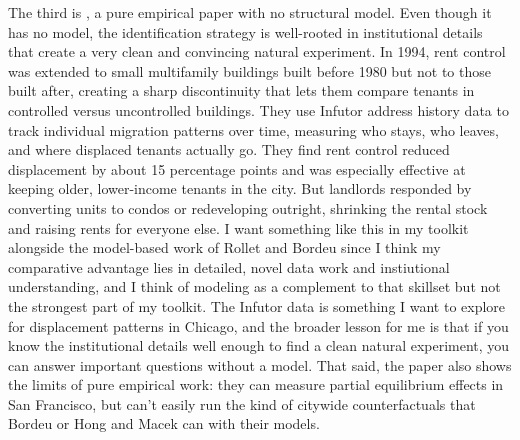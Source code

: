 \documentclass{article}
\begin{document}
The third is \cite{diamond_effects_2019}, a pure empirical paper with no structural model.
Even though it has no model, the identification strategy is well-rooted in institutional details that create a very clean and convincing natural experiment. 
In 1994, rent control was extended to small multifamily buildings built before 1980 but not to those built after, creating a sharp discontinuity that lets them compare tenants in controlled versus uncontrolled buildings.
They use Infutor address history data to track individual migration patterns over time, measuring who stays, who leaves, and where displaced tenants actually go.
They find rent control reduced displacement by about 15 percentage points and was especially effective at keeping older, lower-income tenants in the city.
But landlords responded by converting units to condos or redeveloping outright, shrinking the rental stock and raising rents for everyone else.
I want something like this in my toolkit alongside the model-based work of Rollet and Bordeu since I think my comparative advantage lies in detailed, novel data work and instiutional understanding, and I think of modeling as a complement to that skillset but not the strongest part of my toolkit. 
The Infutor data is something I want to explore for displacement patterns in Chicago, and the broader lesson for me is that if you know the institutional details well enough to find a clean natural experiment, you can answer important questions without a model.
That said, the paper also shows the limits of pure empirical work: they can measure partial equilibrium effects in San Francisco, but can't easily run the kind of citywide counterfactuals that Bordeu or Hong and Macek can with their models.
\clearpage



\end{document}
